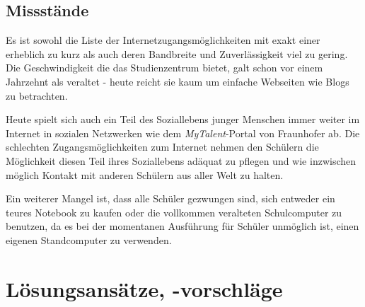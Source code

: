 \documentclass[10pt,a4paper,notitlepage]{scrartcl}
\begin{document}
\subsection{Missstände}
\begin{multicols}{2}
Es ist sowohl die Liste der Internetzugangsmöglichkeiten mit exakt einer erheblich zu kurz als auch deren Bandbreite und Zuverlässigkeit viel zu gering. Die Geschwindigkeit die das Studienzentrum bietet, galt schon vor einem Jahrzehnt als veraltet - heute reicht sie kaum um einfache Webseiten wie Blogs zu betrachten.

Heute spielt sich auch ein Teil des Soziallebens junger Menschen immer weiter im Internet in sozialen Netzwerken wie dem \emph{MyTalent}-Portal von Fraunhofer ab. Die schlechten Zugangsmöglichkeiten zum Internet nehmen den Schülern die Möglichkeit diesen Teil ihres Soziallebens adäquat zu pflegen und wie inzwischen möglich Kontakt mit anderen Schülern aus aller Welt zu halten.

Ein weiterer Mangel ist, dass alle Schüler gezwungen sind, sich entweder ein teures Notebook zu kaufen oder die vollkommen veralteten Schulcomputer zu benutzen, da es bei der momentanen Ausführung für Schüler unmöglich ist, einen eigenen Standcomputer zu verwenden.
\end{multicols}
%
%
\section{Lösungsansätze, -vorschläge}
\end{document}
